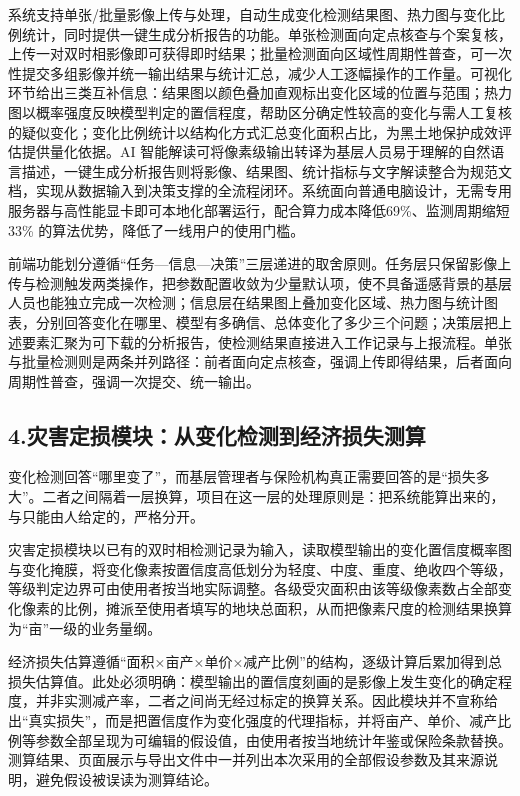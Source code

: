 \documentclass[12pt, a4paper]{ctexart}
\begin{document}
系统支持单张/批量影像上传与处理，自动生成变化检测结果图、热力图与变化比例统计，同时提供一键生成分析报告的功能。单张检测面向定点核查与个案复核，上传一对双时相影像即可获得即时结果；批量检测面向区域性周期性普查，可一次性提交多组影像并统一输出结果与统计汇总，减少人工逐幅操作的工作量。可视化环节给出三类互补信息：结果图以颜色叠加直观标出变化区域的位置与范围；热力图以概率强度反映模型判定的置信程度，帮助区分确定性较高的变化与需人工复核的疑似变化；变化比例统计以结构化方式汇总变化面积占比，为黑土地保护成效评估提供量化依据。AI 智能解读可将像素级输出转译为基层人员易于理解的自然语言描述，一键生成分析报告则将影像、结果图、统计指标与文字解读整合为规范文档，实现从数据输入到决策支撑的全流程闭环。系统面向普通电脑设计，无需专用服务器与高性能显卡即可本地化部署运行，配合算力成本降低69\%、监测周期缩短33\% 的算法优势，降低了一线用户的使用门槛。

前端功能划分遵循“任务—信息—决策”三层递进的取舍原则。任务层只保留影像上传与检测触发两类操作，把参数配置收敛为少量默认项，使不具备遥感背景的基层人员也能独立完成一次检测；信息层在结果图上叠加变化区域、热力图与统计图表，分别回答变化在哪里、模型有多确信、总体变化了多少三个问题；决策层把上述要素汇聚为可下载的分析报告，使检测结果直接进入工作记录与上报流程。单张与批量检测则是两条并列路径：前者面向定点核查，强调上传即得结果，后者面向周期性普查，强调一次提交、统一输出。

\subsection{4.灾害定损模块：从变化检测到经济损失测算}

变化检测回答“哪里变了”，而基层管理者与保险机构真正需要回答的是“损失多大”。二者之间隔着一层换算，项目在这一层的处理原则是：把系统能算出来的，与只能由人给定的，严格分开。

灾害定损模块以已有的双时相检测记录为输入，读取模型输出的变化置信度概率图与变化掩膜，将变化像素按置信度高低划分为轻度、中度、重度、绝收四个等级，等级判定边界可由使用者按当地实际调整。各级受灾面积由该等级像素数占全部变化像素的比例，摊派至使用者填写的地块总面积，从而把像素尺度的检测结果换算为“亩”一级的业务量纲。

经济损失估算遵循“面积×亩产×单价×减产比例”的结构，逐级计算后累加得到总损失估算值。此处必须明确：模型输出的置信度刻画的是影像上发生变化的确定程度，并非实测减产率，二者之间尚无经过标定的换算关系。因此模块并不宣称给出“真实损失”，而是把置信度作为变化强度的代理指标，并将亩产、单价、减产比例等参数全部呈现为可编辑的假设值，由使用者按当地统计年鉴或保险条款替换。测算结果、页面展示与导出文件中一并列出本次采用的全部假设参数及其来源说明，避免假设被误读为测算结论。
\end{document}
